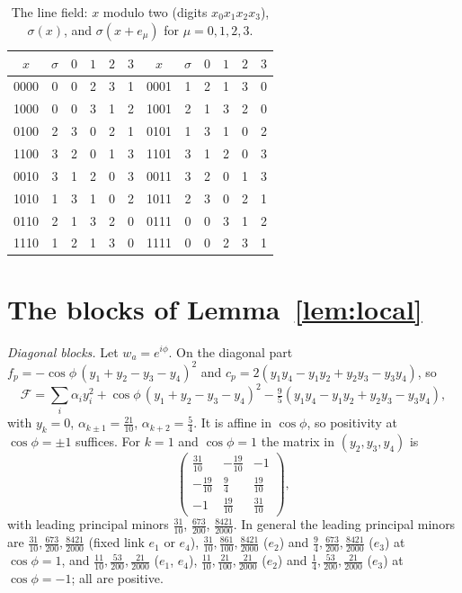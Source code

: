 \begin{table}[h]
\caption{The line field: $x$ modulo two (digits $x_0x_1x_2x_3$), $\sigma(x)$, and
$\sigma(x+e_\mu)$ for $\mu=0,1,2,3$.}
\label{tab:sigma}
\begin{tabular}{cccccc|cccccc}
\toprule
$x$&$\sigma$&$0$&$1$&$2$&$3$&$x$&$\sigma$&$0$&$1$&$2$&$3$\\
\midrule
0000 & 0 & 0 & 2 & 3 & 1 & 0001 & 1 & 2 & 1 & 3 & 0 \\
1000 & 0 & 0 & 3 & 1 & 2 & 1001 & 2 & 1 & 3 & 2 & 0 \\
0100 & 2 & 3 & 0 & 2 & 1 & 0101 & 1 & 3 & 1 & 0 & 2 \\
1100 & 3 & 2 & 0 & 1 & 3 & 1101 & 3 & 1 & 2 & 0 & 3 \\
0010 & 3 & 1 & 2 & 0 & 3 & 0011 & 3 & 2 & 0 & 1 & 3 \\
1010 & 1 & 3 & 1 & 0 & 2 & 1011 & 2 & 3 & 0 & 2 & 1 \\
0110 & 2 & 1 & 3 & 2 & 0 & 0111 & 0 & 0 & 3 & 1 & 2 \\
1110 & 1 & 2 & 1 & 3 & 0 & 1111 & 0 & 0 & 2 & 3 & 1 \\
\bottomrule
\end{tabular}
\end{table}

\section{The blocks of Lemma~\ref{lem:local}}\label{app:blocks}

\emph{Diagonal blocks.} Let $w_a=e^{i\phi}$. On the diagonal part
$f_p=-\cos\phi\,(y_1+y_2-y_3-y_4)^2$ and $c_p=2(y_1y_4-y_1y_2+y_2y_3-y_3y_4)$, so
\[
\mathcal F=\sum_i\alpha_iy_i^2+\cos\phi\,(y_1+y_2-y_3-y_4)^2-\tfrac95(y_1y_4-y_1y_2
+y_2y_3-y_3y_4),
\]
with $y_k=0$, $\alpha_{k\pm1}=\frac{21}{10}$, $\alpha_{k+2}=\frac54$. It is affine in
$\cos\phi$, so positivity at $\cos\phi=\pm1$ suffices. For $k=1$ and $\cos\phi=1$
the matrix in $(y_2,y_3,y_4)$ is
\[
\begin{pmatrix}\frac{31}{10}&-\frac{19}{10}&-1\\[2pt]-\frac{19}{10}&\frac94&
\frac{19}{10}\\[2pt]-1&\frac{19}{10}&\frac{31}{10}\end{pmatrix},
\]
with leading principal minors $\frac{31}{10}$, $\frac{673}{200}$,
$\frac{8421}{2000}$. In general the leading principal minors are
$\frac{31}{10},\frac{673}{200},\frac{8421}{2000}$ (fixed link $e_1$ or $e_4$),
$\frac{31}{10},\frac{861}{100},\frac{8421}{2000}$ ($e_2$) and
$\frac94,\frac{673}{200},\frac{8421}{2000}$ ($e_3$) at $\cos\phi=1$, and
$\frac{11}{10},\frac{53}{200},\frac{21}{2000}$ ($e_1$, $e_4$),
$\frac{11}{10},\frac{21}{100},\frac{21}{2000}$ ($e_2$) and
$\frac14,\frac{53}{200},\frac{21}{2000}$ ($e_3$) at $\cos\phi=-1$; all are
positive.

